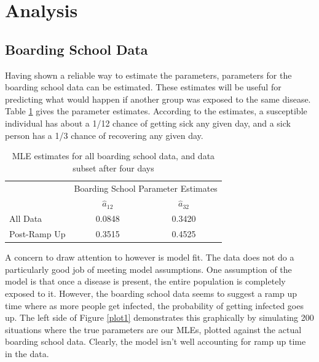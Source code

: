 \documentclass{svproc}
\begin{document}
\section{Analysis}
\subsection*{Boarding School Data}
Having shown a reliable way to estimate the parameters, parameters for the boarding school data can be estimated. These estimates will be useful for predicting what would happen if another group was exposed to the same disease. Table \ref{tab2} gives the parameter estimates. According to the estimates, a susceptible individual has about a 1/12 chance of getting sick any given day, and a sick person has a 1/3 chance of recovering any given day.
\begin{table}
\centering
\setlength{\tabcolsep}{30pt}
\begin{tabular}{l|c|c|}
\cline{2-3}
&\multicolumn{2}{|c|}{Boarding School Parameter Estimates} \\
\cline{2-3}
&$\hat{a}_{12}$ & $\hat{a}_{32}$ \\ \hline
All Data&0.0848 & 0.3420 \\ \hline
Post-Ramp Up&0.3515 & 0.4525 \\ \hline
\end{tabular}
\caption{MLE estimates for all boarding school data, and data subset after four days}
\label{tab2}
\end{table}

A concern to draw attention to however is model fit. The data does not do a particularly good job of meeting model assumptions. One assumption of the model is that once a disease is present, the entire population is completely exposed to it. However, the boarding school data seems to suggest a ramp up time where as more people get infected, the probability of getting infected goes up. The left side of Figure \ref{plot1} demonstrates this graphically by simulating 200 situations where the true parameters are our MLEs, plotted against the actual boarding school data. Clearly, the model isn't well accounting for ramp up time in the data.
\end{document}
